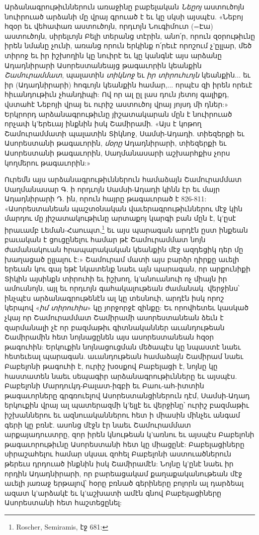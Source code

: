 \documentclass{article}
\begin{document}
{Արձանագրութիւններուն առաջինը բաբելական \emph{Նեըոյ} աստուծոյն նուիրուած արձանի մը վրայ գրուած է եւ կը սկսի այսպէս. «Նեբոյ հզօր եւ վեհափառ աստուծոյն, որդւոյն Նուգիմուտ (=Էա) աստուծոյն, սիրելւոյն Բելի տերանց տէրին, անո՛ր, որուն զօրութիւնը իրեն նմանը չունի, առանց որուն երկինք ո՛րեւէ որոշում չ'ըլլար, մեծ տիրոջ եւ իր իշխողին կը նուիրէ եւ կը կանգնէ այս արձանը Ադադնիրարի Ասորեստանեայց թագաւորին կեանքին \emph{Շամուրամմատ}, պալատին \emph{տիկնոջ} եւ \emph{իր տիրուհւոյն} կեանքին... եւ իր (Ադադնիրարի) հոգւոյն կեանքին համար,... որպէս զի իրեն որեւէ հիւանդութիւն չհանդիպի: Ով որ ալ ըլ լաս դուն յետոյ գալիքդ, վստահէ Նեբոյի վրայ եւ ուրիշ աստուծոյ վրայ յոյսդ մի դներ:» Երկրորդ արձանագրութիւնը յիշատակարան մըն է նուիրուած որչափ կ'երեւայ ինքնին իսկ Շամիրամի. «Այս է կոթող Շամուրամմատի պալատին Տիկնոջ, Սամսի-Ադադի. տիեզերքի եւ Ասորեստանի թագաւորին, \emph{մօրը} Ադադնիրարի, տիեզերքի եւ Ասորեստանի թագաւորին, Սաղմանասարի աշխարհքիս չորս կողմերու թագաւորին:»

Ուրեմն այս արձանագրութիւններուն համաձայն Շամուրամմատ Սաղմանասար Գ. ի որդւոյն Սամսի-Ադադի կինն էր եւ մայր Ադադնիրարի Դ. ին, որուն հայրը թագաւորած է 826-811: «Ասորեստանեան պաշտօնական վաւերագրութիւններու մէջ կին մարդու մը յիշատակութիւնը արտաքոյ կարգի բան մըն է, կ'ըսէ իրաւամբ Լեման-Հաուպտ,\footnote{Roscher, Semiramis, էջ 681:} եւ այս պարագան արդէն ըստ ինքեան բաւական է ցուցընելու համար թէ Շամուրամմատ նոյն ժամանակուան հրապարակական կեանքին մէջ ազդեցիկ դեր մը խաղացած ըլլալու է:» Շամուրամ մատի այս բարձր դիրքը աւելի երեւան կու գայ եթէ նկատենք նաեւ այն պարագան, որ արքունիքի Տիկին այսինքն տիրուհի եւ իշխող, կ'անուանուի ոչ միայն իր ամուսնոյն, այլ եւ որդւոյն գահակալութեան ժամանակ. վերջինս՝ ինչպէս արձանագրութենէն ալ կը տեսնուի, արդէն իսկ որոշ կերպով «\emph{իմ տիրուհիս}» կը յորջորջէ զինքը: Եւ որովհետեւ կասկած չկայ որ Շամուրամմատ Շամիրամի ասորեստանեան ձեւն է զարմանալի չէ որ բազմաթիւ գիտնականներ աւանդութեան Շամիրամին հետ նոյնացընեն այս ասորեստանեան հզօր թագուհին: Երկուքին նոյնացուցման մեծապէս կը նպաստէ նաեւ հետեւեալ պարագան. աւանդութեան համաձայն Շամիրամ նաեւ Բաբելոնի թագուհի է, ուրիշ խօսքով Բաբելացի է, նոյնը կը հաստատեն նաեւ սեպագիր արձանագրութիւնները եւ այսպէս. Բաբելոնի Մարդուկդ-Բալատ-իգբի եւ Բաու-ահ-իտտին թագաւորները գրգռուելով Ասորեստանցիներուն դէմ, Սամսի-Ադադ երկուքին վրայ ալ պատերազմի կ'ելլէ եւ վերջինը՝ ուրիշ բազմաթիւ իշխաններու եւ ազնուականներու հետ ի միասին մինչեւ անգամ գերի կը բռնէ. ասոնց մէջն էր նաեւ Շամուրամմատ արքայադուստրը, զոր իրեն կնութեան կ'առնու եւ այսպէս Բաբելոնի թագաւորութիւնը Ասորեստանի հետ կը միացընէ: Բաբելացիները սիրաշահելու համար սկսաւ զոհել Բաբելոնի աստուածներուն թերեւս դրդուած ինքնին իսկ Շամիրամէն: Նոյնը կ'ընէ նաեւ իր որդին Ադադնիրարի, որ բարեացակամ քաղաքականութեան մէջ աւելի յառաջ երթալով՝ հօրը բռնած գերիները բոլորն ալ դարձեալ ազատ կ'արձակէ եւ կ'աշխատի ամէն գնով Բաբելացիները Ասորեստանի հետ հաշտեցընել:

}
\end{document}
